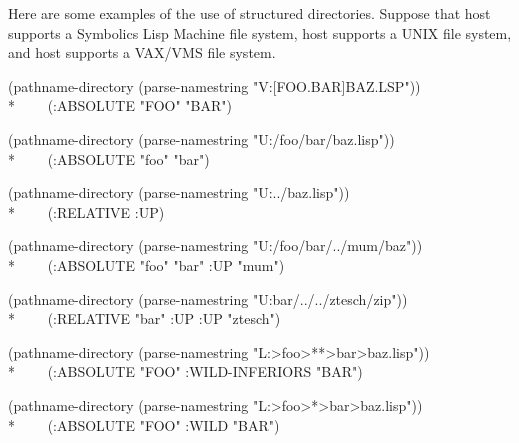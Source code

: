 \begin{newer}
Here are some examples of the use of structured directories.
Suppose that host  supports a Symbolics Lisp Machine file system,
host  supports a UNIX file system, and
host  supports a VAX/VMS file system.
\begin{lisp}
(pathname-directory (parse-namestring "V:[FOO.BAR]BAZ.LSP")) \\*
~~~\EV\ (:ABSOLUTE "FOO" "BAR")
\end{lisp}
\begin{lisp}
(pathname-directory (parse-namestring "U:/foo/bar/baz.lisp")) \\*
~~~\EV\ (:ABSOLUTE "foo" "bar")
\end{lisp}
\begin{lisp}
(pathname-directory (parse-namestring "U:../baz.lisp")) \\*
~~~\EV\ (:RELATIVE :UP)
\end{lisp}
\begin{lisp}
(pathname-directory (parse-namestring "U:/foo/bar/../mum/baz")) \\*
~~~\EV\ (:ABSOLUTE "foo" "bar" :UP "mum")
\end{lisp}
\begin{lisp}
(pathname-directory (parse-namestring "U:bar/../../ztesch/zip")) \\*
~~~\EV\ (:RELATIVE "bar" :UP :UP "ztesch")
\end{lisp}
\begin{lisp}
(pathname-directory (parse-namestring "L:>foo>**>bar>baz.lisp")) \\*
~~~\EV\ (:ABSOLUTE "FOO" :WILD-INFERIORS "BAR")
\end{lisp}
\begin{lisp}
(pathname-directory (parse-namestring "L:>foo>*>bar>baz.lisp")) \\*
~~~\EV\ (:ABSOLUTE "FOO" :WILD "BAR")
\end{lisp}
\end{newer}

